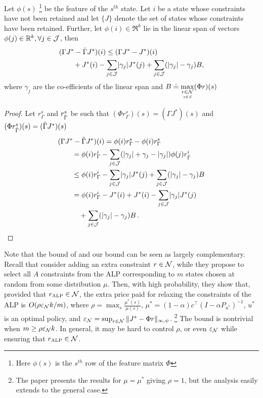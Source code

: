 \begin{theorem}
Let $\phi(s)$%
\footnote{Here $\phi(s)$ is the $s^{th}$ row of the feature matrix $\Phi$} be the feature of the $s^{th}$ state. Let $i$ be a state whose constraints have not been retained and let $\{J\}$ denote the set of states whose constraints have been retained. Further, let $\phi(i)\in \Re^k$ lie in the linear span of vectors $\phi(j)\in \mathbb{R}^k,\forall j\in \mathcal{J}$, then
\begin{align*}
\MoveEqLeft (\Gamma J^*-\hg J^*)(i)
 \leq 
(\Gamma J^*-J^*)(i) \\
& {}+J^*(i)-\underset{j\in \J}{\sum} |\gamma_j| J^*(j)
+ \underset{j\in \J}{\sum}(|\gamma_j|-\gamma_j) B,
\end{align*}
where $\gamma_j$ are the co-efficients of the linear span and $B\doteq \underset{\underset{s\in S}{r\in \mathcal{N}}}{\max}(\Phi r) (s)$
\end{theorem}
\begin{proof}
Let $r^s_{\Gamma}$ and $r^s_{\hat{\Gamma}}$ be such that $(\Phi r^s_{\Gamma})(s)=(\Gamma J^*)(s)$ and $(\Phi r^s_{\hat{\Gamma}})(s)=(\hat{\Gamma} J^*)(s)$
\begin{align*}
\MoveEqLeft (\Gamma J^*-\hg J^*)(i) 
=\phi(i) r^s_{\Gamma}- \phi(i) r^s_{\Gamma}\\
&=\phi(i) r^i_{\Gamma}- \underset{j\in \J}{\sum} (|\gamma_j|+\gamma_j -|\gamma_j|)\phi(j) r^i_{\hg}\\
&\leq \phi(i) r^i_{\Gamma}- \underset{j\in \J}{\sum} |\gamma_j| J^*(j) + \underset{j\in \J} {\sum} (|\gamma_j|-\gamma_j)B\\
&= \phi(i) r^i_{\Gamma}- J^*(i)+ J^*(i) -\underset{j\in \J}{\sum} |\gamma_j| J^*(j) \\
& \quad + \underset{j\in \J}{\sum} (|\gamma_j|-\gamma_j)B\,.
\end{align*}
\end{proof}



Note that the bound of \cite{CS} and our bound can be seen as largely complementary. 
Recall that \citeauthor{CS} consider adding an extra constraint $r\in \mathcal{N}$, while they propose to select all $A$ constraints
from the ALP corresponding to $m$ states chosen at random from some distribution $\mu$. 
Then, with high probability,
they show that, provided that $r_{\text{\sc ALP}} \in \mathcal{N}$,
 the extra price paid for relaxing the constraints of the ALP is $O( \rho \varepsilon_{\mathcal{N}} k/m)$,
 where $\rho = \max_{s} \frac{\mu^*(s)}{\mu(s)}$, $\mu^* = (1-\alpha)c^\top (I-\alpha P_{u^*})^{-1}$, $u^*$ is an optimal policy,
and $\varepsilon_{\mathcal{N}} = \sup_{r\in \mathcal{N}} \|J^*-\Phi r\|_{\infty,\psi}$.%
\footnote{The paper presents the results for $\mu = \mu^*$ giving $\rho=1$, but the analysis easily extends to the general case.}
The bound is nontrivial when $m\ge \rho \varepsilon_{\mathcal{N}} k$.
In general, it may be hard to control $\rho$, or even $\varepsilon_{\mathcal{N}}$ while ensuring that $r_{\text{\sc ALP}} \in \mathcal{N}$.



